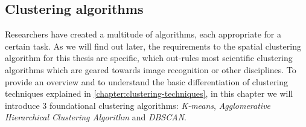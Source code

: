 \subsection{Clustering algorithms}

Researchers have created a multitude of algorithms, each appropriate for a certain task. As we will find out later, the requirements to the spatial clustering algorithm for this thesis are specific, which out-rules most scientific clustering algorithms which are geared towards image recognition or other disciplines. To provide an overview and to understand the basic differentiation of clustering techniques explained in \ref{chapter:clustering-techniques}, in this chapter we will introduce 3 foundational clustering algorithms: \textit{K-means}, \textit{Agglomerative Hierarchical Clustering Algorithm} and \textit{DBSCAN}.

